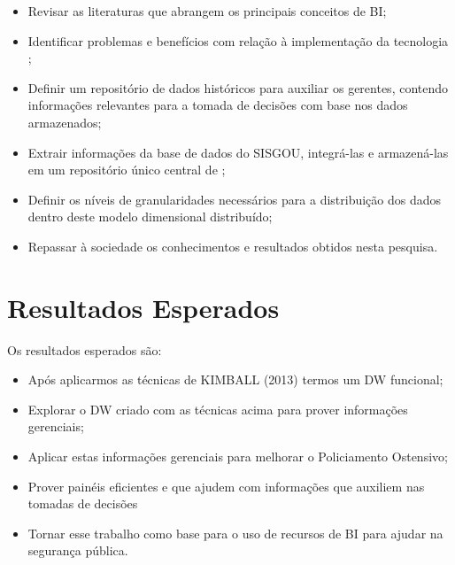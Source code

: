 \begin{itemize}

    \item Revisar as literaturas que abrangem os principais conceitos de BI; 
    \item Identificar problemas e benefícios com relação à implementação da tecnologia  ;
    \item Definir um repositório de dados históricos para auxiliar os gerentes, contendo informações relevantes para a tomada de decisões com base nos dados armazenados;
    \item Extrair informações da base de dados do SISGOU, integrá-las e armazená-las em um repositório único central de ;
    \item Definir os níveis de granularidades necessários para a distribuição dos dados dentro deste modelo dimensional distribuído;
    \item Repassar à sociedade os conhecimentos e resultados obtidos nesta pesquisa.

\end{itemize}

\section{Resultados Esperados}

Os resultados esperados s\~{a}o:

\begin{itemize}

    \item Após aplicarmos as t\'{e}cnicas de KIMBALL (2013) termos um DW funcional;
    \item Explorar o DW criado com as t\'{e}cnicas acima para prover informa\c{c}ões gerenciais;
    \item Aplicar estas informa\c{c}ões gerenciais para melhorar o Policiamento Ostensivo;
    \item Prover pain\'{e}is  eficientes e que ajudem com informa\c{c}ões que auxiliem nas tomadas de decisões
    \item Tornar esse trabalho como base para o uso de recursos de BI para ajudar na seguran\c{c}a pública.

\end{itemize}
